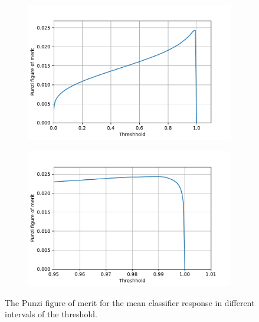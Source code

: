 \begin{figure}
  \centering
  \begin{subfigure}[b]{0.45\textwidth}
    \centering
    \includegraphics[width=\textwidth]{"content/plots/pfom_full.pdf"}
  \end{subfigure}
  \hfill
  \begin{subfigure}[b]{0.45\textwidth}
    \centering
    \includegraphics[width=\textwidth]{"content/plots/pfom_zoom.pdf"}
  \end{subfigure}
  \caption{The Punzi figure of merit for the mean classifier response in different intervals of the threshold.}
  \label{fig:pFOM}
\end{figure}

